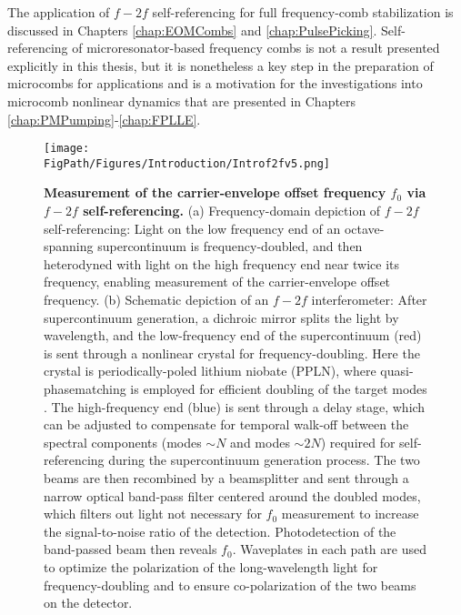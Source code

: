 The application of $f-2f$ self-referencing for full frequency-comb stabilization is discussed in Chapters \ref{chap:EOMCombs} and \ref{chap:PulsePicking}. Self-referencing of microresonator-based frequency combs is not a result presented explicitly in this thesis, but it is nonetheless a key step in the preparation of microcombs for applications and is a  motivation for the investigations into microcomb nonlinear dynamics that are presented in Chapters \ref{chap:PMPumping}-\ref{chap:FPLLE}.


\begin{figure}[htpb]
	\begin{center}
		\texttt{[image: \\FigPath/Figures/Introduction/Introf2fv5.png]}
	\end{center}
	\caption[Measurement of the carrier-envelope offset frequency via $f-2f$ self-referencing]{\textbf{Measurement of the carrier-envelope offset frequency $f_0$ via $f-2f$ self-referencing.} (a) Frequency-domain depiction of $f-2f$ self-referencing: Light on the low frequency end of an octave-spanning supercontinuum is frequency-doubled, and then heterodyned with light on the high frequency end near twice its frequency, enabling measurement of the carrier-envelope offset frequency. (b) Schematic depiction of an $f-2f$ interferometer: After supercontinuum generation, a dichroic mirror splits the light by wavelength, and the low-frequency end of the supercontinuum (red) is sent through a nonlinear crystal for frequency-doubling. Here the crystal is periodically-poled lithium niobate (PPLN), where quasi-phasematching is employed for efficient doubling of the target modes \cite{Hum2007}. The high-frequency end (blue) is sent through a delay stage, which can be adjusted to compensate for temporal walk-off between the spectral components (modes $\sim N$ and modes $\sim 2N$) required for self-referencing during the supercontinuum generation process. The two beams are then recombined by a beamsplitter and sent through a narrow optical band-pass filter centered around the doubled modes, which filters out light not necessary for $f_0$ measurement to increase the signal-to-noise ratio of the detection. Photodetection of the band-passed beam then reveals $f_0$. Waveplates in each path are used to optimize the polarization of the long-wavelength light for frequency-doubling and to ensure co-polarization of the two beams on the detector. }
	\label{fig:f2f}
\end{figure} 
